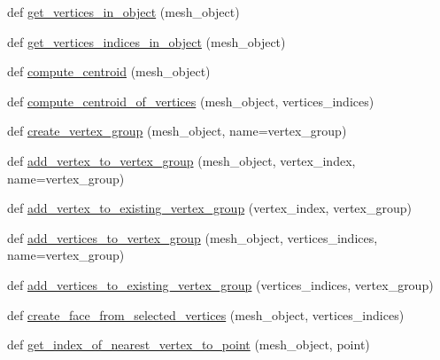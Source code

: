 \begin{DoxyCompactItemize}
\item 
def \hyperlink{namespacemeshy_1_1neuromorphovis_1_1mesh_1_1ops_1_1mesh__vertex__ops_a856836ceddb3aa75eb68cdcc885c7d74}{get\+\_\+vertices\+\_\+in\+\_\+object} (mesh\+\_\+object)
\item 
def \hyperlink{namespacemeshy_1_1neuromorphovis_1_1mesh_1_1ops_1_1mesh__vertex__ops_a991885cbbbcf4ffc86933ae5ce495d15}{get\+\_\+vertices\+\_\+indices\+\_\+in\+\_\+object} (mesh\+\_\+object)
\item 
def \hyperlink{namespacemeshy_1_1neuromorphovis_1_1mesh_1_1ops_1_1mesh__vertex__ops_a07ceafba5064f97b242917b906df2a76}{compute\+\_\+centroid} (mesh\+\_\+object)
\item 
def \hyperlink{namespacemeshy_1_1neuromorphovis_1_1mesh_1_1ops_1_1mesh__vertex__ops_adcd78d669672538a5380ade6e69b188e}{compute\+\_\+centroid\+\_\+of\+\_\+vertices} (mesh\+\_\+object, vertices\+\_\+indices)
\item 
def \hyperlink{namespacemeshy_1_1neuromorphovis_1_1mesh_1_1ops_1_1mesh__vertex__ops_ab81534f7b5f0075e73cbcbf74444d8d4}{create\+\_\+vertex\+\_\+group} (mesh\+\_\+object, name=\textquotesingle{}vertex\+\_\+group\textquotesingle{})
\item 
def \hyperlink{namespacemeshy_1_1neuromorphovis_1_1mesh_1_1ops_1_1mesh__vertex__ops_a315bf5ef3248b2d4f2e7c89bec3f361e}{add\+\_\+vertex\+\_\+to\+\_\+vertex\+\_\+group} (mesh\+\_\+object, vertex\+\_\+index, name=\textquotesingle{}vertex\+\_\+group\textquotesingle{})
\item 
def \hyperlink{namespacemeshy_1_1neuromorphovis_1_1mesh_1_1ops_1_1mesh__vertex__ops_ad747d2411fe686b81438e025cdd57bac}{add\+\_\+vertex\+\_\+to\+\_\+existing\+\_\+vertex\+\_\+group} (vertex\+\_\+index, vertex\+\_\+group)
\item 
def \hyperlink{namespacemeshy_1_1neuromorphovis_1_1mesh_1_1ops_1_1mesh__vertex__ops_acd5fe6a6a24edff2f38c00719bf9c037}{add\+\_\+vertices\+\_\+to\+\_\+vertex\+\_\+group} (mesh\+\_\+object, vertices\+\_\+indices, name=\textquotesingle{}vertex\+\_\+group\textquotesingle{})
\item 
def \hyperlink{namespacemeshy_1_1neuromorphovis_1_1mesh_1_1ops_1_1mesh__vertex__ops_a1aea2fc404e4762ae6599642527b8c88}{add\+\_\+vertices\+\_\+to\+\_\+existing\+\_\+vertex\+\_\+group} (vertices\+\_\+indices, vertex\+\_\+group)
\item 
def \hyperlink{namespacemeshy_1_1neuromorphovis_1_1mesh_1_1ops_1_1mesh__vertex__ops_a9a3fff44b5ee19423c69a824f0e7aa2d}{create\+\_\+face\+\_\+from\+\_\+selected\+\_\+vertices} (mesh\+\_\+object, vertices\+\_\+indices)
\item 
def \hyperlink{namespacemeshy_1_1neuromorphovis_1_1mesh_1_1ops_1_1mesh__vertex__ops_a4c5433aaf9359413e2deafc7c1da27be}{get\+\_\+index\+\_\+of\+\_\+nearest\+\_\+vertex\+\_\+to\+\_\+point} (mesh\+\_\+object, point)
\end{DoxyCompactItemize}


